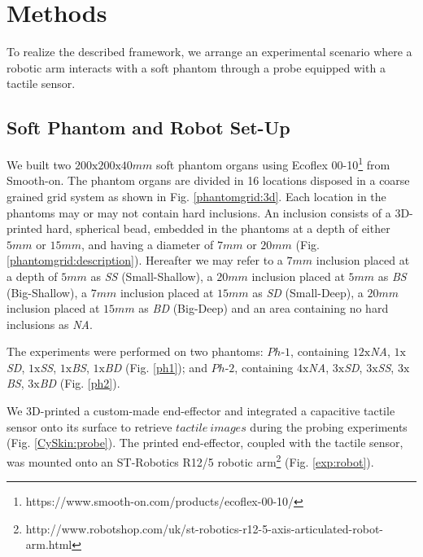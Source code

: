 \documentclass[]{interact}
\theoremstyle{plain}%
\theoremstyle{definition}
\theoremstyle{remark}
\begin{document}
\section{Methods} \label{sec_methods}
To realize the described framework, we arrange an experimental scenario where a robotic arm interacts with a 
soft phantom through a probe equipped with a tactile sensor. 



\subsection{Soft Phantom and Robot Set-Up} \label{sec_experimental_setups}
We built two $200\text{x}200\text{x}40mm$ soft phantom organs using Ecoflex 00-10\footnote[2]
{https://www.smooth-on.com/products/ecoflex-00-10/} from Smooth-on. The phantom organs are divided in 16 
locations disposed in a coarse grained grid system as shown in Fig. \ref{phantomgrid:3d}. Each location in the 
phantoms may or may not contain hard inclusions. An inclusion consists of a 3D-printed hard, spherical bead, 
embedded in the phantoms at a depth of either $5mm$ or $15mm$, and having a diameter of 
$7mm$ or $20mm$ (Fig. \ref{phantomgrid:description}). Hereafter we may refer to a $7mm$ inclusion 
placed at a depth of $5mm$ as \textit{SS} (Small-Shallow), a $20mm$ inclusion placed at $5mm$ as \textit{BS} 
(Big-Shallow), a $7mm$ inclusion placed at $15mm$ as \textit{SD} (Small-Deep), a $20mm$ inclusion placed at 
$15mm$ as \textit{BD} (Big-Deep) and an area containing no hard inclusions as \textit{NA}.

The experiments were performed on two phantoms: $Ph\text{-}1$, containing $12\text{x}$\textit{NA}, $1\text{x}$\textit{SD}, $1\text{x}$\textit{SS}, $1\text{x}$\textit{BS}, $1\text{x}$\textit{BD} (Fig. \ref{ph1}); and $Ph\text{-}2$, containing $4\text{x}$\textit{NA}, $3\text{x}$\textit{SD}, $3\text{x}$\textit{SS}, $3\text{x}$\textit{BS}, $3\text{x}$\textit{BD} (Fig. \ref{ph2}).

We 3D-printed a custom-made end-effector and integrated a capacitive tactile sensor onto its 
surface to retrieve $tactile\ images$ during the probing experiments (Fig. \ref{CySkin:probe}). 
The printed end-effector, coupled with the tactile sensor, was mounted onto an ST-Robotics R12/5 robotic 
arm\footnote[3]{http://www.robotshop.com/uk/st-robotics-r12-5-axis-articulated-robot-arm.html}   
(Fig. \ref{exp:robot}). 
\end{document}
